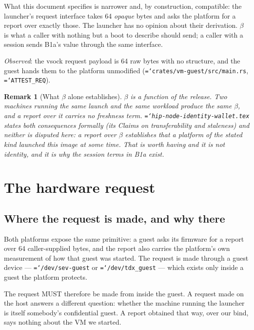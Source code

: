\documentclass[11pt,a4paper]{article}
\newtheorem{remark}[definition]{Remark}
\newcommand{\code}[1]{\texttt{\hyphenchar\font=`\-\relax #1}}
\begin{document}
What this document specifies is narrower and, by construction, compatible: the
launcher's request interface takes 64 \emph{opaque} bytes and asks the platform
for a report over exactly those. The launcher has no opinion about their
derivation. $\beta$ is what a caller with nothing but a boot to describe should
send; a caller with a session sends B1a's value through the same interface.

\emph{Observed}: the vsock request payload is 64 raw bytes with no structure, and
the guest hands them to the platform unmodified
(\code{crates/vm-guest/src/main.rs}, \code{ATTEST\_REQ}).

\begin{remark}[What $\beta$ alone establishes]
$\beta$ is a function of the release. Two machines running the same launch and the
same workload produce the same $\beta$, and a report over it carries no freshness
term. \code{hip-node-identity-wallet.tex} states both consequences formally (its
Claims on transferability and staleness) and neither is disputed here: a report
over $\beta$ establishes that \emph{a} platform of the stated kind launched
\emph{this} image at \emph{some} time. That is worth having and it is not
identity, and it is why the session terms in B1a exist.
\end{remark}

\section{The hardware request}
\label{sec:hardware}

\subsection{Where the request is made, and why there}

Both platforms expose the same primitive: a guest asks its firmware for a report
over 64 caller-supplied bytes, and the report also carries the platform's own
measurement of how that guest was started. The request is made through a guest
device --- \code{/dev/sev-guest} or \code{/dev/tdx\_guest} --- which exists only
inside a guest the platform protects.

The request MUST therefore be made from inside the guest. A request made on the
host answers a different question: whether the machine running the launcher is
itself somebody's confidential guest. A report obtained that way, over our bind,
says nothing about the VM we started.
\end{document}
